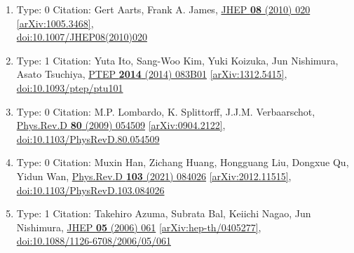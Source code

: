 \documentclass[a4paper,10pt]{article}
\begin{document}
\begin{enumerate}
\begin{enumerate}
  \item Type: 0 Citation: Gert Aarts, Frank A. James, \href{https://www.doi.org/10.1007/JHEP08(2010)020}{JHEP {\bf 08} (2010) 020}  \href{https://arxiv.org/abs/1005.3468}{[arXiv:1005.3468]},\\\href{https://www.doi.org/10.1007/JHEP08(2010)020}{doi:10.1007/JHEP08(2010)020}
  \item Type: 1 Citation: Yuta Ito, Sang-Woo Kim, Yuki Koizuka, Jun Nishimura, Asato Tsuchiya, \href{https://www.doi.org/10.1093/ptep/ptu101}{PTEP {\bf 2014} (2014) 083B01}  \href{https://arxiv.org/abs/1312.5415}{[arXiv:1312.5415]},\\\href{https://www.doi.org/10.1093/ptep/ptu101}{doi:10.1093/ptep/ptu101}
  \item Type: 0 Citation: M.P. Lombardo, K. Splittorff, J.J.M. Verbaarschot, \href{https://www.doi.org/10.1103/PhysRevD.80.054509}{Phys.Rev.D {\bf 80} (2009) 054509}  \href{https://arxiv.org/abs/0904.2122}{[arXiv:0904.2122]},\\\href{https://www.doi.org/10.1103/PhysRevD.80.054509}{doi:10.1103/PhysRevD.80.054509}
  \item Type: 0 Citation: Muxin Han, Zichang Huang, Hongguang Liu, Dongxue Qu, Yidun Wan, \href{https://www.doi.org/10.1103/PhysRevD.103.084026}{Phys.Rev.D {\bf 103} (2021) 084026}  \href{https://arxiv.org/abs/2012.11515}{[arXiv:2012.11515]},\\\href{https://www.doi.org/10.1103/PhysRevD.103.084026}{doi:10.1103/PhysRevD.103.084026}
  \item Type: 1 Citation: Takehiro Azuma, Subrata Bal, Keiichi Nagao, Jun Nishimura, \href{https://www.doi.org/10.1088/1126-6708/2006/05/061}{JHEP {\bf 05} (2006) 061}  \href{https://arxiv.org/abs/hep-th/0405277}{[arXiv:hep-th/0405277]},\\\href{https://www.doi.org/10.1088/1126-6708/2006/05/061}{doi:10.1088/1126-6708/2006/05/061}

\end{enumerate}
\end{enumerate}
\end{document}
